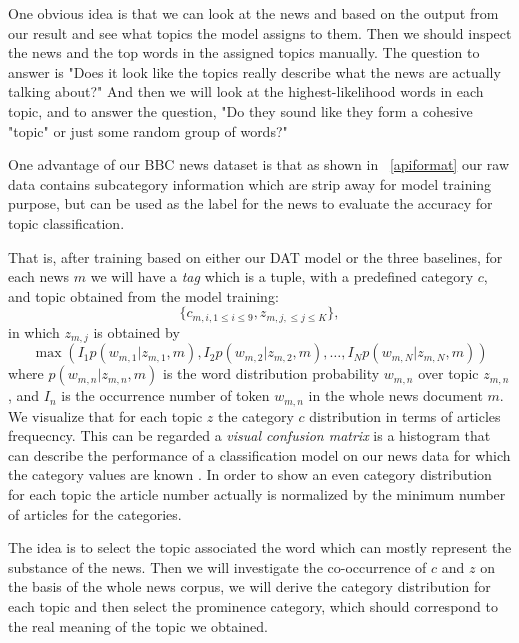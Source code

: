 {One obvious idea is that we can look at the news and based on the output from our result and see what topics the model assigns to them. Then we should inspect the news and the top words in the assigned topics manually. The question to answer is "Does it look like the topics really describe what the news are actually talking about?" And then we will look at the highest-likelihood words in each topic, and to answer the question, "Do they sound like they form a cohesive "topic" or just some random group of words?"

One advantage of our BBC news dataset is that as shown in ~\ref{apiformat} our raw data contains subcategory information which are strip away for model training purpose, but can be used as the label for the news to evaluate the accuracy for topic classification. 

That is, after training based on either our DAT model or the three baselines, for each news $m$ we will have a \textit{tag} which is a tuple, with a predefined category $c$, and topic obtained from the model training:
\begin{equation}
\{c_{m, i, 1 \leq i \leq 9}, z_{m, j, \leq j \leq K}\}, 
\end{equation}
in which $z_{m,j}$ is obtained by 
\begin{equation}
\max ({I_1{p(w_{m,1}|z_{m,1},m)}},{I_2{p(w_{m,2}|z_{m,2},m)}}, \ldots , {I_N{p(w_{m,N}|z_{m,N},m)}})
\end{equation}
where ${{p(w_{m,n}|z_{m,n},m)}}$ is the word distribution probability $w_{m,n}$ over topic $z_{m,n}$, and ${I_n}$ is the occurrence number of token $w_{m,n}$ in the whole news document $m$. We visualize that for each topic $z$ the category $c$ distribution in terms of articles frequecncy. This can be regarded a \textit{visual confusion matrix} is a histogram that can describe the performance of a classification model on our news data for which the category values are known \cite{townsend1971theoretical}. In order to show an even category distribution for each topic the article number actually is normalized by the minimum number of articles for the categories.


The idea is to select the topic associated the word which can mostly represent the substance of the news. Then we will investigate the co-occurrence of $c$ and $z$ on the basis of the whole news corpus, we will derive the category distribution for each topic and then select the prominence category, which should correspond to the real meaning of the topic we obtained.


}
